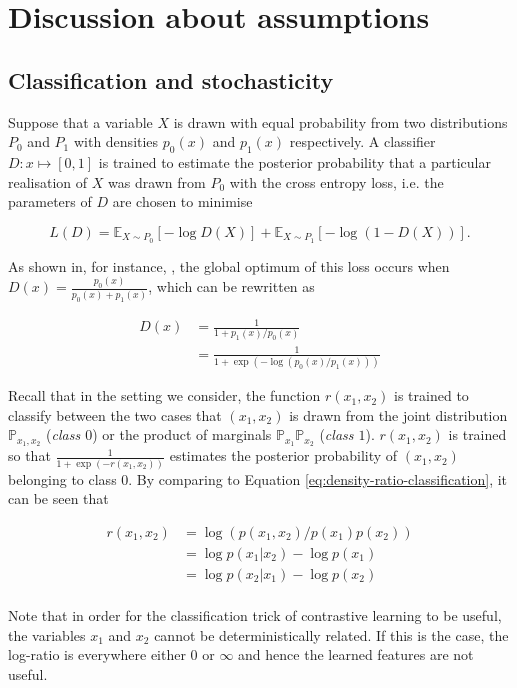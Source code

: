 \section{Discussion about assumptions}
\subsection{Classification and stochasticity}
\label{sec:converged}
Suppose that a variable $X$ is drawn with equal probability from two distributions $P_0$ and $P_1$ with densities $p_0(x)$ and $p_1(x)$ respectively.
A classifier $D: x \mapsto [0,1]$ is trained to estimate the posterior probability that a particular realisation of $X$ was drawn from $P_0$ with the cross entropy loss, i.e. the parameters of $D$ are chosen to minimise

\[
L(D) = \mathbb{E}_{X\sim P_0} \left[ - \log D(X) \right] + \mathbb{E}_{X\sim P_1} \left[ - \log (1 - D(X)) \right].
\]

As shown in, for instance, \cite{goodfellow2014generative}, the global optimum of this loss occurs when $D(x) = \frac{p_0(x)}{p_0(x) + p_1(x)}$, which can be rewritten as

\begin{align}
D(x) &= \frac{1}{1 + p_1(x)/p_0(x)}\\
&= \frac{1}{1 + \exp ( - \log (p_0(x)/p_1(x))) } \label{eq:density-ratio-classification}
\end{align}

Recall that in the setting we consider, the function $r(x_1, x_2)$ is trained to classify between the two cases that $(x_1, x_2)$ is drawn from the joint distribution $\mathbb{P}_{x_1, x_2}$ (\emph{class $0$}) or the product of marginals $\mathbb{P}_{x_1}\mathbb{P}_{x_2}$ (\emph{class $1$}).
$r(x_1, x_2)$ is trained so that $\frac{1}{1 + \exp(-r(x_1, x_2))}$ estimates the posterior probability of $(x_1, x_2)$ belonging to class 0.
By comparing to Equation \ref{eq:density-ratio-classification}, it can be seen that

\begin{align*}
r(x_1, x_2) &= \log \left( p(x_1, x_2) / p(x_1) p(x_2)\right) \\
&= \log p(x_1 | x_2)  - \log p(x_1) \\
&= \log p(x_2 | x_1)  - \log p(x_2) \\
\end{align*}

Note that in order for the classification trick of contrastive learning to be useful, the variables $x_1$ and $x_2$ cannot be deterministically related.
If this is the case, the log-ratio is everywhere either $0$ or $\infty$ and hence the learned features are not useful.

